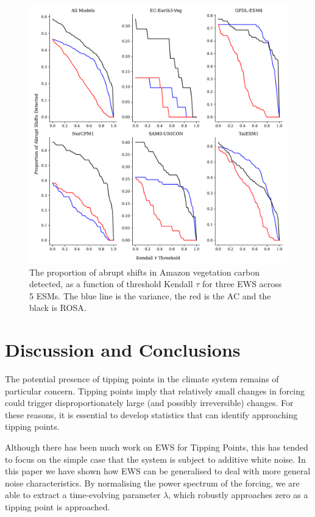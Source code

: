 \begin{figure}
\includegraphics[width=\textwidth,keepaspectratio]{figure4}
\caption[ROSA in CMIP6]{The proportion of abrupt shifts in Amazon vegetation carbon
detected, as a function of threshold Kendall $\tau$ for three EWS across 5 ESMs. The blue line is the variance,
the red is the AC and the black is ROSA.}\label{fig:complex_test}
\end{figure}



\section{Discussion and Conclusions}
The potential presence of tipping points in the climate system remains of particular concern. 
Tipping points imply that relatively small changes in forcing could trigger
disproportionately large (and possibly irreversible) changes.
For these reasons, it is essential to develop
statistics that can identify approaching tipping points.

Although there has been much work on EWS for Tipping Points,
this has tended to focus on the simple case that the system is subject to additive white noise. 
In this paper we have shown how EWS can be generalised to deal with more general noise characteristics. By normalising the power spectrum of the forcing, we are able to extract a 
time-evolving parameter $\lambda$, which robustly approaches zero as a tipping point is approached.  

